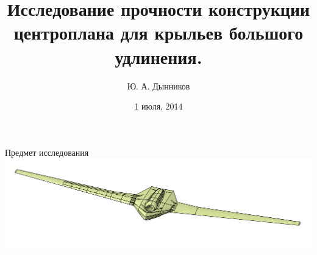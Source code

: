 \documentclass{beamer}
\title{Исследование прочности конструкции центроплана для крыльев большого удлинения.}
\author{Ю. А. Дынников}
\institute{062 уч. группа}
\date{1 июля, 2014}
\begin{document}
\begin{frame}
\titlepage
\end{frame}

\begin{frame}[t]{Предмет исследования}
\centering
\vfill
\includegraphics[width=\textwidth]{BPS_Catia_Full}

\end{frame}

\end{document}
